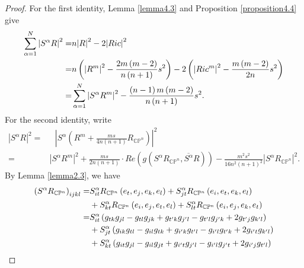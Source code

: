 \documentclass{amsart}
\theoremstyle{definition}
\theoremstyle{remark}
\numberwithin{equation}{section}
\begin{document}
\begin{proof}
For the first  identity,  Lemma \ref{lemma4.3} and Proposition \ref{proposition4.4} give
\begin{align*}
  \sum\limits_{\alpha  = 1}^N {{{\left| {{S^\alpha }R} \right|}^2}}  =& n{\left| R \right|^2} - 2{\left| {Ric} \right|^2} \hfill \\
   =& n\left( {{{\left| {{R^m}} \right|}^2} - \frac{{2m\left( {m - 2} \right)}}{{n\left( {n + 1} \right)}}{s^2}} \right) - 2\left( {{{\left| {Ri{c^m}} \right|}^2} - \frac{{m\left( {m - 2} \right)}}{{2n}}{s^2}} \right) \hfill \\
   =& \sum\limits_{\alpha  = 1}^N {{{\left| {{S^\alpha }{R^m}} \right|}^2}}  - \frac{{\left( {n - 1} \right)m\left( {m - 2} \right)}}{{n\left( {n + 1} \right)}}{s^2}.
\end{align*}
For the second identity, write
\begin{align*}
{\left| {{S^\alpha }R} \right|^2} =& {\text{ }}{\left| {{S^\alpha }\left( {{R^m} + \frac{{ms}}{{4n\left( {n + 1} \right)}}{R_{\mathbb{C}{\mathbb{P}^n}}}} \right)} \right|^2}\\
 =& {\left| {{S^\alpha }{R^m}} \right|^2} + \frac{{ms}}{{2n\left( {n + 1} \right)}} \cdot Re \left( g\left( {{S^\alpha }{R_{\mathbb{C}{\mathbb{P}^n}}},\overline {{S^\alpha }} R} \right) \right) - \frac{{{m^2}{s^2}}}{{16{n^2}{{\left( {n + 1} \right)}^2}}}{\left| {{S^\alpha }{R_{\mathbb{C}{\mathbb{P}^n}}}} \right|^2}.
\end{align*}
By  Lemma \ref{lemma2.3}, we have
\begin{align*}
  {\left( {{S^\alpha }{R_{\mathbb{C}{\mathbb{P}^n}}}} \right)_{ijkl}} =& S_{it}^\alpha {R_{\mathbb{C}{\mathbb{P}^n}}}\left( {{e_t},{e_j},{e_k},{e_l}} \right) + S_{jt}^\alpha {R_{\mathbb{C}{\mathbb{P}^n}}}\left( {{e_i},{e_t},{e_k},{e_l}} \right) \hfill \\
   &+ S_{kt}^\alpha {R_{\mathbb{C}{\mathbb{P}^n}}}\left( {{e_i},{e_j},{e_t},{e_l}} \right) + S_{lt}^\alpha {R_{\mathbb{C}{\mathbb{P}^n}}}\left( {{e_i},{e_j},{e_k},{e_t}} \right) \hfill \\
   =& S_{it}^\alpha \left( {{g_{tk}}{g_{jl}} - {g_{tl}}{g_{jk}} + {g_{t'k}}{g_{j'l}} - {g_{t'l}}{g_{j'k}} + 2{g_{t'j}}{g_{k'l}}} \right) \hfill \\
   &+ S_{jt}^\alpha \left( {{g_{ik}}{g_{tl}} - {g_{il}}{g_{tk}} + {g_{i'k}}{g_{t'l}} - {g_{i'l}}{g_{t'k}} + 2{g_{i't}}{g_{k'l}}} \right) \hfill \\
   &+ S_{kt}^\alpha \left( {{g_{it}}{g_{jl}} - {g_{il}}{g_{jt}} + {g_{i't}}{g_{j'l}} - {g_{i'l}}{g_{j't}} + 2{g_{i'j}}{g_{t'l}}} \right) \hfill \\

\end{align*}
\end{proof}
\end{document}
